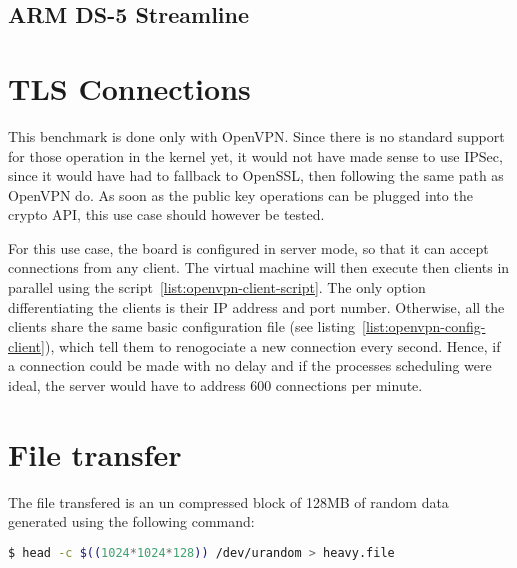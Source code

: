 \subsection{ARM DS-5 Streamline}

\section{TLS Connections}
This benchmark is done only with OpenVPN.
Since there is no standard support for those operation in the kernel yet, it would not have made sense to use IPSec, since it would have had to fallback to OpenSSL, then following the same path as OpenVPN do.
As soon as the public key operations can be plugged into the crypto API, this use case should however be tested.

For this use case, the board is configured in server mode, so that it can accept connections from any client.
The virtual machine will then execute then clients in parallel using the script~\ref{list:openvpn-client-script}.
The only option differentiating the clients is their IP address and port number.
Otherwise, all the clients share the same basic configuration file (see listing~\ref{list:openvpn-config-client}), which tell them to renogociate a new connection every second.
Hence, if a connection could be made with no delay and if the processes scheduling were ideal, the server would have to address 600 connections per minute.



\section{File transfer}
The file transfered is an un compressed block of 128MB of random data generated using the following command:
\begin{lstlisting}[language=bash]
  $ head -c $((1024*1024*128)) /dev/urandom > heavy.file
\end{lstlisting}
